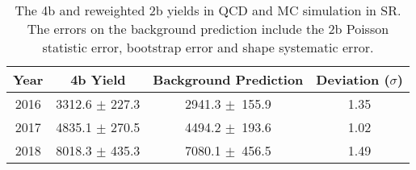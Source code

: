 \begin{table}[ht]
    \centering
    \caption{The 4b and reweighted 2b yields in QCD and \ttbar MC simulation in SR. The errors on the background prediction include the 2b Poisson statistic error, bootstrap error and shape systematic error.}
    \setlength\extrarowheight{5pt}
    \begin{tabular}{cccc}
        \toprule
            Year & 4b Yield & Background Prediction & Deviation ($\sigma$) \\
        \midrule
            2016 & 3312.6 $\pm$ 227.3 & 2941.3 $\pm$ 155.9 & 1.35 \\
            2017 & 4835.1 $\pm$ 270.5 & 4494.2 $\pm$ 193.6 & 1.02 \\
            2018 & 8018.3 $\pm$ 435.3 & 7080.1 $\pm$ 456.5 & 1.49 \\
        \bottomrule
    \end{tabular}
    \label{tbl:mc-4b-yields}
\end{table}
